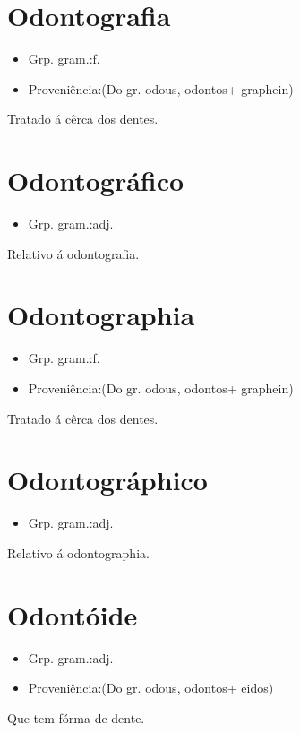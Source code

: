 \section{Odontografia}
\begin{itemize}
\item {Grp. gram.:f.}
\end{itemize}
\begin{itemize}
\item {Proveniência:(Do gr. \textunderscore odous\textunderscore , \textunderscore odontos\textunderscore  + \textunderscore graphein\textunderscore )}
\end{itemize}
Tratado á cêrca dos dentes.
\section{Odontográfico}
\begin{itemize}
\item {Grp. gram.:adj.}
\end{itemize}
Relativo á odontografia.
\section{Odontographia}
\begin{itemize}
\item {Grp. gram.:f.}
\end{itemize}
\begin{itemize}
\item {Proveniência:(Do gr. \textunderscore odous\textunderscore , \textunderscore odontos\textunderscore  + \textunderscore graphein\textunderscore )}
\end{itemize}
Tratado á cêrca dos dentes.
\section{Odontográphico}
\begin{itemize}
\item {Grp. gram.:adj.}
\end{itemize}
Relativo á odontographia.
\section{Odontóide}
\begin{itemize}
\item {Grp. gram.:adj.}
\end{itemize}
\begin{itemize}
\item {Proveniência:(Do gr. \textunderscore odous\textunderscore , \textunderscore odontos\textunderscore  + \textunderscore eidos\textunderscore )}
\end{itemize}
Que tem fórma de dente.
